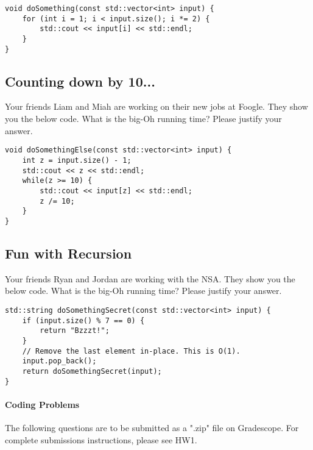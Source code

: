 \documentclass [12pt]{article}
\begin{document}
\vspace{2em}
\begin{verbatim}
void doSomething(const std::vector<int> input) {
    for (int i = 1; i < input.size(); i *= 2) {
        std::cout << input[i] << std::endl;
    }
}
\end{verbatim}


\subsection{Counting down by 10...}
 Your friends Liam and Miah are working on their new jobs at Foogle. They show you the below code. What is the big-Oh running time? Please justify your answer.

\vspace{2em}
\begin{verbatim}
void doSomethingElse(const std::vector<int> input) {
    int z = input.size() - 1;
    std::cout << z << std::endl;
    while(z >= 10) {
        std::cout << input[z] << std::endl;
        z /= 10;
    }
}
\end{verbatim}


\pagebreak
\subsection{Fun with Recursion}
 Your friends Ryan and Jordan are working with the NSA. They show you the below code. What is the big-Oh running time? Please justify your answer.

\vspace{2em}
\begin{verbatim}
std::string doSomethingSecret(const std::vector<int> input) {
    if (input.size() % 7 == 0) {
        return "Bzzzt!";
    }
    // Remove the last element in-place. This is O(1).
    input.pop_back();
    return doSomethingSecret(input);
}
\end{verbatim}


\pagebreak
\begin{Instruction}

\paragraph{Coding Problems} The following questions are to be submitted as a ".zip" file on Gradescope. For complete submissions instructions, please see HW1.

\end{Instruction}
\end{document}
